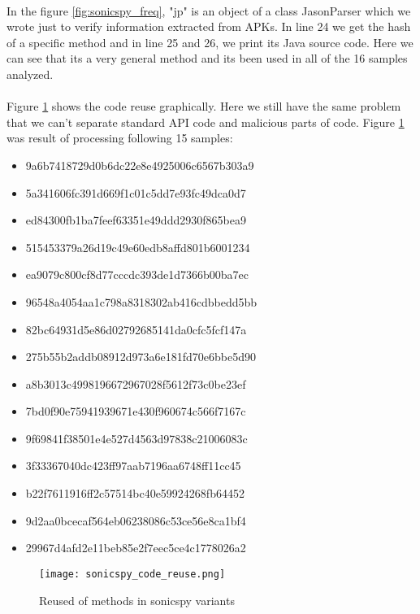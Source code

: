 \documentclass[../main.tex]{subfile}
\begin{document}
		\paragraph{} In the figure \ref{fig:sonicspy_freq}, "jp" is an object of a class JasonParser which we wrote just to verify information extracted from APKs. In line 24 we get the hash of a specific method and in line 25 and 26, we print its Java source code. Here we can see that its a very general method and its been used in all of the 16 samples analyzed.
		
		\paragraph{} Figure \ref{fig:sonicspy_graph} shows the code reuse graphically. Here we still have the same problem that we can't separate standard API code and malicious parts of code. Figure \ref{fig:sonicspy_graph} was result of processing following 15 samples:
		\begin{itemize}
			\item 9a6b7418729d0b6dc22e8e4925006c6567b303a9
			\item 5a341606fc391d669f1c01c5dd7e93fc49dca0d7
			\item ed84300fb1ba7feef63351e49ddd2930f865bea9
			\item 515453379a26d19c49e60edb8affd801b6001234
			\item ea9079c800cf8d77cccdc393de1d7366b00ba7ec
			\item 96548a4054aa1c798a8318302ab416cdbbedd5bb
			\item 82bc64931d5e86d02792685141da0cfc5fcf147a
			\item 275b55b2addb08912d973a6e181fd70e6bbe5d90
			\item a8b3013c4998196672967028f5612f73c0be23ef
			\item 7bd0f90e75941939671e430f960674c566f7167c
			\item 9f69841f38501e4e527d4563d97838c21006083c
			\item 3f33367040dc423ff97aab7196aa6748ff11cc45
			\item b22f7611916ff2c57514bc40e59924268fb64452
			\item 9d2aa0bcecaf564eb06238086c53ce56e8ca1bf4
			\item 29967d4afd2e11beb85e2f7eec5ce4c1778026a2
		\end{itemize}
		
		\begin{figure}
			\texttt{[image: sonicspy\_code\_reuse.png]}
			\caption{Reused of methods in sonicspy variants}
			\label{fig:sonicspy_graph}			
		\end{figure}
		
\end{document}
